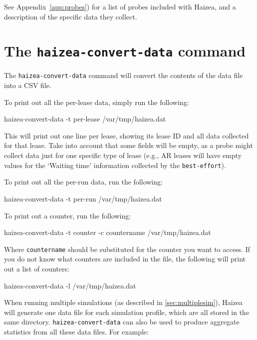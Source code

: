 See Appendix~\ref{app:probes}) for a list of probes included with Haizea, and a description of the specific data they collect.


\section{The \texttt{haizea-convert-data} command}
\label{sec:haizea-convert-data}

The \texttt{haizea-convert-data} command will convert the contents of the data file into a CSV file. 

To print out all the per-lease data, simply run the following: 

\begin{shellverbatim}
haizea-convert-data -t per-lease /var/tmp/haizea.dat
\end{shellverbatim}

This will print out one line per lease, showing its lease ID and all data collected for that lease. Take into account that some fields will be empty, as a probe might collect data just for one specific type of lease (e.g., AR leases will have empty values for the `Waiting time' information collected by the \texttt{best-effort}).

To print out all the per-run data, run the following:

\begin{shellverbatim}
haizea-convert-data -t per-run /var/tmp/haizea.dat
\end{shellverbatim}

To print out a counter, run the following:

\begin{shellverbatim}
haizea-convert-data -t counter -c countername /var/tmp/haizea.dat
\end{shellverbatim}

Where \texttt{countername} should be substituted for the counter you want to access. If you do not know what counters are included in the file, the following will print out a list of counters:

\begin{shellverbatim}
haizea-convert-data -l /var/tmp/haizea.dat
\end{shellverbatim}

When running multiple simulations (as described in \ref{sec:multiplesim}), Haizea will generate one data file for each simulation profile, which are all stored in the same directory. \texttt{haizea-convert-data} can also be used to produce aggregate statistics from all these data files. For example:

